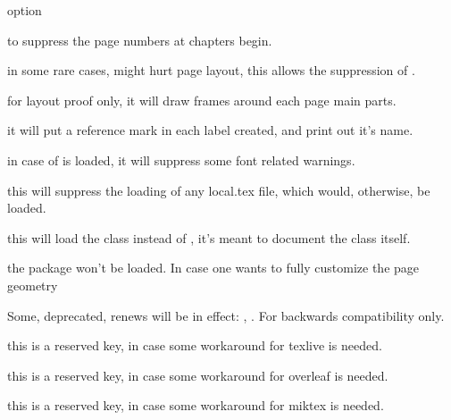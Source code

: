 \documentclass[article,nogeometry,english,tocdepth=3,secdepth=3]{ufrgscca} %
\begin{document}
\begin{describelist}{option}

	 { to suppress the page numbers at chapters begin.}

	 { in some rare cases,  might hurt page layout, this allows the suppression of .}

	 { for layout proof only, it will draw frames around each page main parts.}

	 { it will put a reference mark in each label created, and print out it's name.}

	 { in case of  is loaded, it will suppress some font related warnings.}

	 { this will suppress the loading of any local.tex file, which would, otherwise, be loaded.}

	 { this will load the  class   instead of , it's meant to document the class itself.}

	 { the package  won't be loaded. In case one wants to fully customize the page geometry}

	 { Some, deprecated, renews will be in effect: \tsobj{\maketitle}, \tsobj{\author} \tsobj{\begin{abstract}}. For backwards compatibility only. }

	 { this is a reserved key, in case some workaround for texlive is needed.}

	 { this is a reserved key, in case some workaround for overleaf is needed.}

	 { this is a reserved key, in case some workaround for miktex is needed.}
\end{describelist}
\end{document}
